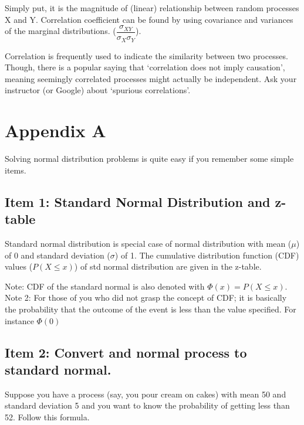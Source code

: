 \documentclass[]{book}
\theoremstyle{definition}
\theoremstyle{definition}
\theoremstyle{definition}
\theoremstyle{remark}
\begin{document}
Simply put, it is the magnitude of (linear) relationship between random
processes X and Y. Correlation coefficient can be found by using
covariance and variances of the marginal distributions.
(\(\dfrac{\sigma_{XY}}{\sigma_X\sigma_Y}\)).

Correlation is frequently used to indicate the similarity between two
processes. Though, there is a popular saying that `correlation does not
imply causation', meaning seemingly correlated processes might actually
be independent. Ask your instructor (or Google) about `spurious
correlations'.

\hypertarget{appendix-appendix}{%
\appendix}


\hypertarget{appendix-a}{%
\chapter{Appendix A}\label{appendix-a}}

Solving normal distribution problems is quite easy if you remember some
simple items.

\hypertarget{item-1-standard-normal-distribution-and-z-table}{%
\section{Item 1: Standard Normal Distribution and
z-table}\label{item-1-standard-normal-distribution-and-z-table}}

Standard normal distribution is special case of normal distribution with
mean (\(\mu\)) of 0 and standard deviation (\(\sigma\)) of 1. The
cumulative distribution function (CDF) values (\(P(X \le x)\)) of std
normal distribution are given in the z-table.

Note: CDF of the standard normal is also denoted with
\(\Phi(x) = P(X \le x)\). Note 2: For those of you who did not grasp the
concept of CDF; it is basically the probability that the outcome of the
event is less than the value specified. For instance \(\Phi(0)\)

\hypertarget{item-2-convert-and-normal-process-to-standard-normal.}{%
\section{Item 2: Convert and normal process to standard
normal.}\label{item-2-convert-and-normal-process-to-standard-normal.}}

Suppose you have a process (say, you pour cream on cakes) with mean 50
and standard deviation 5 and you want to know the probability of getting
less than 52. Follow this formula.
\end{document}

